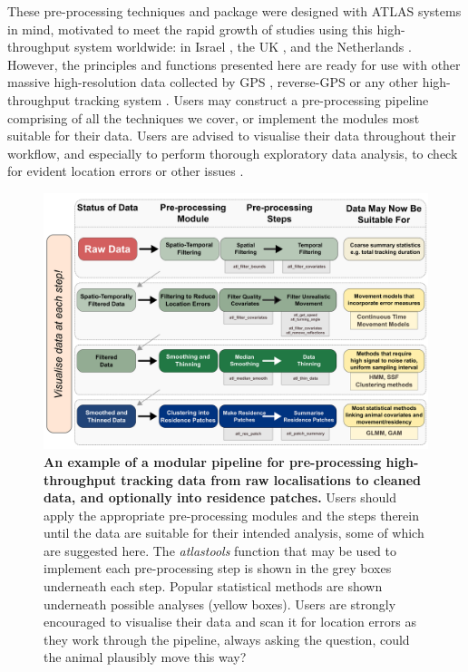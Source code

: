 \begin{refsection}[sorting=nyt]
    These pre-processing techniques and package were designed with ATLAS systems in mind, motivated to meet the rapid growth of studies using this high-throughput system worldwide: in Israel \citep{toledo2014, toledo2016, toledo2020, corl2020, vilk2021}, the UK \citep{beardsworth2021a, beardsworth2021b}, and the Netherlands \citep[][Bijleveld et al. \textit{in prep.}]{beardsworth2021}. 
    However, the principles and functions presented here are ready for use with other massive high-resolution data collected by GPS \citep[e.g.][]{papageorgiou2019}, reverse-GPS \citep[e.g.][]{aspillaga2021} or any other high-throughput tracking system .
    Users may construct a pre-processing pipeline comprising of all the techniques we cover, or implement the modules most suitable for their data.
    Users are advised to visualise their data throughout their workflow, and especially to perform thorough exploratory data analysis, to check for evident location errors or other issues \citep{slingsby2016}.

    \begin{figure}
        \centering
        \begin{addmargin}{-.3\textwidth}%
        \centering
        \captionsetup{width=13.5cm}
        \includegraphics[width=13.5cm]{figures/preprocessing/fig_02.png}
        \end{addmargin}
        \caption{
            \textbf{An example of a modular pipeline for pre-processing high-throughput tracking data from raw localisations to cleaned data, and optionally into residence patches.}
            Users should apply the appropriate pre-processing modules and the steps therein until the data are suitable for their intended analysis, some of which are suggested here.
            The \textit{atlastools} function that may be used to implement each pre-processing step is shown in the grey boxes underneath each step.
            Popular statistical methods are shown underneath possible analyses (yellow boxes).
            Users are strongly encouraged to visualise their data and scan it for location errors as they work through the pipeline, always asking the question, could the animal plausibly move this way?
        }
        \label{fig2}
    \end{figure}


\end{refsection}
